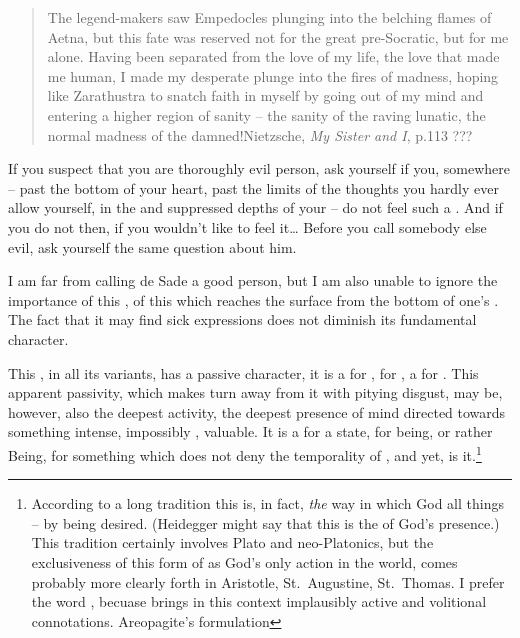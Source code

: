 {\begin{quote}
{The legend-makers saw Empedocles plunging into the belching flames of 
Aetna, but this fate was reserved not for the great pre-Socratic, but 
for me alone. Having been separated from the love of my life, the love 
that made me human, I made my desperate plunge into the fires of 
madness, hoping like Zarathustra to snatch faith in myself by going 
out of my mind and entering a higher region of sanity -- the sanity 
of the raving lunatic, the normal madness of the damned!}{Nietzsche, {\em My Sister and I}, p.113 ???}
\end{quote}
%
\pa
If you suspect that you are thoroughly evil person, ask
yourself if you, somewhere -- past the bottom of your heart, past the 
limits of the thoughts you hardly ever allow yourself, in the
 and suppressed depths of your  -- do not feel
such a . And if you do not then, if you wouldn't like to feel it\ldots
Before you call somebody else evil, ask yourself the same question about 
him.

I am far from calling de Sade a good person, but I am also unable to 
ignore the importance of this , of this  
which reaches the  surface from the bottom of one's 
. The fact that it may find sick expressions does not 
diminish its fundamental character.



\pa This , in all its variants, has a passive character, it is a
 for , for , a  for .  This apparent
passivity, which makes  turn away from it with pitying 
disgust, may be, however, also the deepest  activity, the
deepest  presence of mind directed towards something
 intense, impossibly , 
valuable.  It is a  for a state, for being, or rather Being, for
something which does not deny the temporality of , and
yet, is  it.\footnote{According to a long tradition this is,
in fact, {\em the} way in which God  all things -- by being
desired. (Heidegger might say that this is the  of God's
presence.)  This tradition certainly involves Plato and neo-Platonics,
but the exclusiveness of this form of  as God's only
action in the world, comes probably more clearly forth in Aristotle,
St.~Augustine, St.~Thomas.  I prefer the word , becuase
 brings in this context implausibly active and volitional
connotations. Areopagite's formulation }

}
